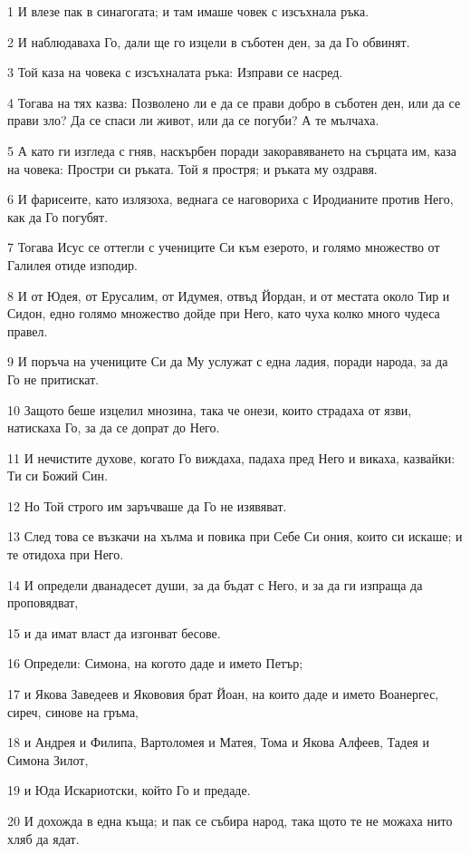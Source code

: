 \par 1 И влезе пак в синагогата; и там имаше човек с изсъхнала ръка.
\par 2 И наблюдаваха Го, дали ще го изцели в съботен ден, за да Го обвинят.
\par 3 Той каза на човека с изсъхналата ръка: Изправи се насред.
\par 4 Тогава на тях казва: Позволено ли е да се прави добро в съботен ден, или да се прави зло? Да се спаси ли живот, или да се погуби? А те мълчаха.
\par 5 А като ги изгледа с гняв, наскърбен поради закоравяването на сърцата им, каза на човека: Простри си ръката. Той я простря; и ръката му оздравя.
\par 6 И фарисеите, като излязоха, веднага се наговориха с Иродианите против Него, как да Го погубят.
\par 7 Тогава Исус се оттегли с учениците Си към езерото, и голямо множество от Галилея отиде изподир.
\par 8 И от Юдея, от Ерусалим, от Идумея, отвъд Йордан, и от местата около Тир и Сидон, едно голямо множество дойде при Него, като чуха колко много чудеса правел.
\par 9 И поръча на учениците Си да Му услужат с една ладия, поради народа, за да Го не притискат.
\par 10 Защото беше изцелил мнозина, така че онези, които страдаха от язви, натискаха Го, за да се допрат до Него.
\par 11 И нечистите духове, когато Го виждаха, падаха пред Него и викаха, казвайки: Ти си Божий Син.
\par 12 Но Той строго им заръчваше да Го не изявяват.
\par 13 След това се възкачи на хълма и повика при Себе Си ония, които си искаше; и те отидоха при Него.
\par 14 И определи дванадесет души, за да бъдат с Него, и за да ги изпраща да проповядват,
\par 15 и да имат власт да изгонват бесове.
\par 16 Определи: Симона, на когото даде и името Петър;
\par 17 и Якова Заведеев и Якововия брат Йоан, на които даде и името Воанергес, сиреч, синове на гръма,
\par 18 и Андрея и Филипа, Вартоломея и Матея, Тома и Якова Алфеев, Тадея и Симона Зилот,
\par 19 и Юда Искариотски, който Го и предаде.
\par 20 И дохожда в една къща; и пак се събира народ, така щото те не можаха нито хляб да ядат.
